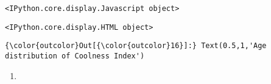 \documentclass[11pt]{article}
\begin{document}
    
    \begin{verbatim}
<IPython.core.display.Javascript object>
    \end{verbatim}

    
    
    \begin{verbatim}
<IPython.core.display.HTML object>
    \end{verbatim}

    
\begin{Verbatim}[commandchars=\\\{\}]
{\color{outcolor}Out[{\color{outcolor}16}]:} Text(0.5,1,'Age distribution of Coolness Index')
\end{Verbatim}
            
    \begin{enumerate}
\def\labelenumi{(\alph{enumi})}
\setcounter{enumi}{1}
\item
\end{enumerate}
\end{document}
